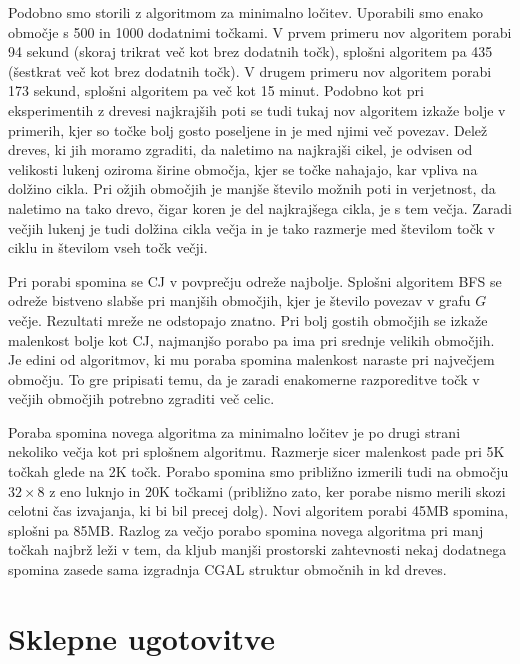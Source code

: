 \documentclass[a4paper, 12pt]{book}
\begin{document}
Podobno smo storili z algoritmom za minimalno ločitev. Uporabili smo enako območje s 500 in 1000 dodatnimi točkami. V prvem primeru nov algoritem porabi 94 sekund (skoraj trikrat več kot brez dodatnih točk), splošni algoritem pa 435 (šestkrat več kot brez dodatnih točk). V drugem primeru nov algoritem porabi 173 sekund, splošni algoritem pa več kot 15 minut. Podobno kot pri eksperimentih z drevesi najkrajših poti se tudi tukaj nov algoritem izkaže bolje v primerih, kjer so točke bolj gosto poseljene in je med njimi več povezav. Delež dreves, ki jih moramo zgraditi, da naletimo na najkrajši cikel, je odvisen od velikosti lukenj oziroma širine območja, kjer se točke nahajajo, kar vpliva na dolžino cikla. Pri ožjih območjih je manjše število možnih poti in verjetnost, da naletimo na tako drevo, čigar koren je del najkrajšega cikla, je s tem večja. Zaradi večjih lukenj je tudi dolžina cikla večja in je tako razmerje med številom točk v ciklu in številom vseh točk večji.

Pri porabi spomina se CJ v povprečju odreže najbolje. Splošni algoritem BFS se odreže bistveno slabše pri manjših območjih, kjer je število povezav v grafu $G$ večje. Rezultati mreže ne odstopajo znatno. Pri bolj gostih območjih se izkaže malenkost bolje kot CJ, najmanjšo porabo pa ima pri srednje velikih območjih. Je edini od algoritmov, ki mu poraba spomina malenkost naraste pri največjem območju. To gre pripisati temu, da je zaradi enakomerne razporeditve točk v večjih območjih potrebno zgraditi več celic. 

Poraba spomina novega algoritma za minimalno ločitev je po drugi strani nekoliko večja kot pri splošnem algoritmu. Razmerje sicer malenkost pade pri 5K točkah glede na 2K točk. Porabo spomina smo približno izmerili tudi na območju $32\times 8$ z eno luknjo in 20K točkami (približno zato, ker porabe nismo merili skozi celotni čas izvajanja, ki bi bil precej dolg). Novi algoritem porabi 45MB spomina, splošni pa 85MB. Razlog za večjo porabo spomina novega algoritma pri manj točkah najbrž leži v tem, da kljub manjši prostorski zahtevnosti nekaj dodatnega spomina zasede sama izgradnja CGAL struktur območnih in kd dreves. 


\chapter{Sklepne ugotovitve}
\label{ch4}
\end{document}
